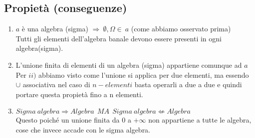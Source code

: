 \subsection{Propietà (conseguenze)}
\begin{enumerate}
\item $a$ è una algebra (sigma) $\Rightarrow \: \emptyset,\Omega \in \: a$ (come abbiamo osservato prima)\\Tutti gli elementi dell'algebra banale devono essere presenti in ogni algebra(sigma).
\item L'unione finita di elementi di un algebra (sigma) appartiene comunque ad $a$\\ Per $ii)$ abbiamo visto come l'unione si applica per due elementi, ma essendo $\cup$ associativa nel caso di $n-elementi$ basta operarli a due a due e quindi portare questa propietà fino a n elementi.
\item $ Sigma\:algebra \Rightarrow Algebra \:\:MA\:\: Sigma\: algebra \not \Leftarrow Algebra $\\
Questo poiché un unione finita da 0 a $+\infty$ non appartiene a tutte le algebra, cose che invece accade con le sigma algebra.
\end{enumerate}







